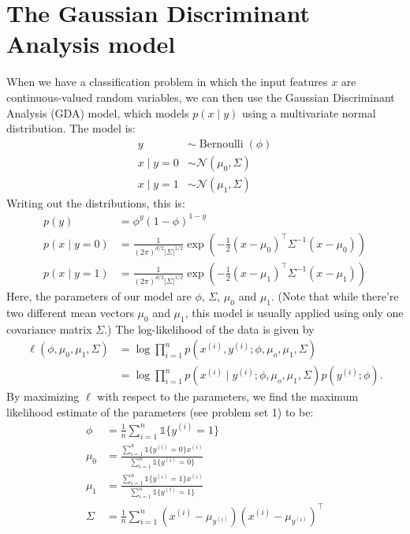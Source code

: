 \section{The Gaussian Discriminant Analysis model}
When we have a classification problem in which the input features $x$ are
continuous-valued random variables, we can then use the Gaussian Discriminant
Analysis (GDA) model, which models $p(x \mid y)$ using a multivariate normal
distribution. The model is:
\begin{align}
    y &\sim \operatorname{Bernoulli}(\phi)\\
    x \mid y = 0 &\sim \mathcal N(\mu_0 ,\Sigma)\\
    x \mid y = 1 &\sim \mathcal N(\mu_1 ,\Sigma)
\end{align}
Writing out the distributions, this is:
\begin{align}
    p(y) &= \phi^y (1 - \phi)^{1-y}\\
    p(x \mid y = 0) &= \frac{1}{(2\pi)^{d/2} |\Sigma|^{1/2}} \exp\left(-\frac{1}{2} (x - \mu_0)^\top \Sigma^{-1}(x-\mu_0) \right)\\
    p(x \mid y = 1) &= \frac{1}{(2\pi)^{d/2} |\Sigma|^{1/2}} \exp\left(-\frac{1}{2} (x - \mu_1)^\top \Sigma^{-1}(x-\mu_1) \right)    
\end{align}
Here, the parameters of our model are $\phi$, $\Sigma$, $\mu_0$ and $\mu_1$. (Note that while
there're two different mean vectors $\mu_0$ and $\mu_1$, this model is usually applied
using only one covariance matrix $\Sigma$.) The log-likelihood of the data is given
by
\begin{align}
    \ell(\phi,\mu_0 ,\mu_1 ,\Sigma) &= \log \prod_{i=1}^n p(x^{(i)}, y^{(i)}; \phi, \mu_o, \mu_1, \Sigma)\\
                                    &= \log \prod_{i=1}^n p(x^{(i)} \mid y^{(i)}; \phi, \mu_o, \mu_1, \Sigma)p(y^{(i)}; \phi).    
\end{align}
By maximizing $\ell$ with respect to the parameters, we find the maximum likelihood
estimate of the parameters (see problem set 1) to be:
\begin{align}
    \phi &= \frac{1}{n} \sum_{i=1}^n \mathbb{1}\{y^{(i)}=1\}\\
    \mu_0 &= \frac{\sum_{i=1}^n \mathbb{1}\{y^{(i)}=0\}x^{(i)}}{\sum_{i=1}^n \mathbb{1}\{y^{(i)}=0\}}\\
    \mu_1 &= \frac{\sum_{i=1}^n \mathbb{1}\{y^{(i)}=1\}x^{(i)}}{\sum_{i=1}^n \mathbb{1}\{y^{(i)}=1\}}\\
    \Sigma &= \frac{1}{n} \sum_{i=1}^n (x^{(i)} - \mu_{y^{(i)}}) (x^{(i)} - \mu_{y^{(i)}})^\top
\end{align}


